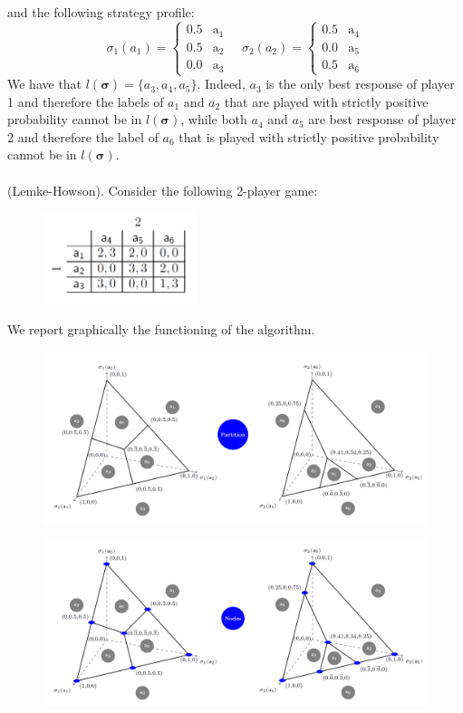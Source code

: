 \noindent
and the following strategy profile:
$$
\sigma_{1}\left(a_{1}\right)=\left\{\begin{array}{ll}
0.5 & \mathrm{a}_{1} \\
0.5 & \mathrm{a}_{2} \\
0.0 & \mathrm{a}_{3}
\end{array} \quad \sigma_{2}\left(a_{2}\right)=\left\{\begin{array}{ll}
0.5 & \mathrm{a}_{4} \\
0.0 & \mathrm{a}_{5} \\
0.5 & \mathrm{a}_{6}
\end{array}\right.\right.
$$
We have that $l( \mathbf{\sigma} ) = \{a_3, a_4, a_5\}$. Indeed, $a_3$ is the only best response of player 1 and therefore the labels of $a_1$ and $a_2$ that are played with strictly positive probability cannot be in $l( \mathbf{\sigma} )$, while both $a_4$ and $a_5$ are best response of player 2 and therefore the label of $a_6$ that is played with strictly positive probability cannot be in $l(\mathbf{\sigma})$.\\\\
(Lemke-Howson). Consider the following 2-player game:
\begin{figure}[H]
\centering
\includegraphics[width=0.4\textwidth]{images/img_2_13_01.png}
\end{figure}
\noindent
We report graphically the functioning of the algorithm.
\begin{figure}[H]
\centering
\includegraphics[width=\textwidth]{images/img_2_13_02.png}
\end{figure}
\begin{figure}[H]
\centering
\includegraphics[width=\textwidth]{images/img_2_13_03.png}
\end{figure}
